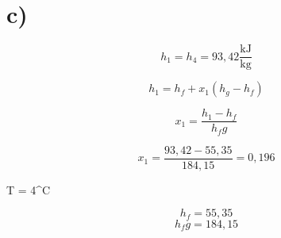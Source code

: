 

\section*{c)}

\[
h_1 = h_4 = 93,42 \frac{\text{kJ}}{\text{kg}}
\]

\[
h_1 = h_f + x_1 (h_g - h_f)
\]

\[
x_1 = \frac{h_1 - h_f}{h_fg}
\]

\[
x_1 = \frac{93,42 - 55,35}{184,15} = 0,196
\]

 \quad T = 4^\circ C

\[
h_f = 55,35
\]
\[
h_fg = 184,15
\]